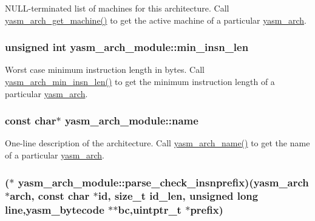 N\-U\-L\-L-\/terminated list of machines for this architecture. Call \hyperlink{arch_8h_a140c8c687d8dfcde94aafc3338ec3bee}{yasm\-\_\-arch\-\_\-get\-\_\-machine()} to get the active machine of a particular \hyperlink{coretype_8h_a8e0de61d73c940f0e7b6ef12e0dc1c70}{yasm\-\_\-arch}. \hypertarget{structyasm__arch__module_a0ca18842f63879a3311ac9f6fe35b8df}{
\subsubsection[{min\-\_\-insn\-\_\-len}]{\setlength{\rightskip}{0pt plus 5cm}unsigned int yasm\-\_\-arch\-\_\-module\-::min\-\_\-insn\-\_\-len}}\label{structyasm__arch__module_a0ca18842f63879a3311ac9f6fe35b8df}
Worst case minimum instruction length in bytes. Call \hyperlink{arch_8h_a59cdef038169de55f73eb37a0f87ddbc}{yasm\-\_\-arch\-\_\-min\-\_\-insn\-\_\-len()} to get the minimum instruction length of a particular \hyperlink{coretype_8h_a8e0de61d73c940f0e7b6ef12e0dc1c70}{yasm\-\_\-arch}. \hypertarget{structyasm__arch__module_af315f36d9f1ffdeb14de19b816ab8ab0}{
\subsubsection[{name}]{\setlength{\rightskip}{0pt plus 5cm}const char$\ast$ yasm\-\_\-arch\-\_\-module\-::name}}\label{structyasm__arch__module_af315f36d9f1ffdeb14de19b816ab8ab0}
One-\/line description of the architecture. Call \hyperlink{arch_8h_a900a62f7862b711046f55203e52acb87}{yasm\-\_\-arch\-\_\-name()} to get the name of a particular \hyperlink{coretype_8h_a8e0de61d73c940f0e7b6ef12e0dc1c70}{yasm\-\_\-arch}. \hypertarget{structyasm__arch__module_a3dde1b6ec44c7d351f795ddafd364c48}{
\subsubsection[{parse\-\_\-check\-\_\-insnprefix}]{($\ast$ yasm\-\_\-arch\-\_\-module\-::parse\-\_\-check\-\_\-insnprefix)({\bf yasm\-\_\-arch} $\ast$arch, const char $\ast$id, size\-\_\-t id\-\_\-len, unsigned long line,{\bf yasm\-\_\-bytecode} $\ast$$\ast$bc,uintptr\-\_\-t $\ast$prefix)}}\label{structyasm__arch__module_a3dde1b6ec44c7d351f795ddafd364c48}
